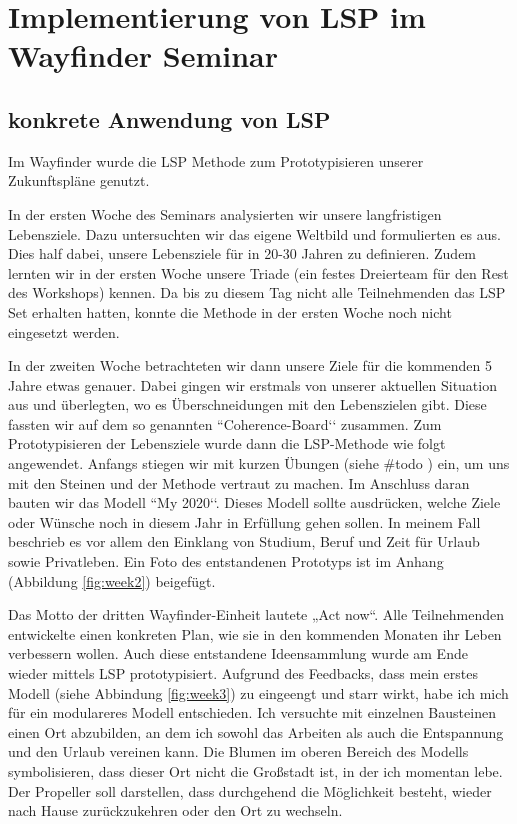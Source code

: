 \section{Implementierung von LSP im Wayfinder Seminar}

\subsection{konkrete Anwendung von LSP}

Im Wayfinder wurde die LSP Methode zum Prototypisieren unserer Zukunftspläne genutzt. 

In der ersten Woche des Seminars analysierten wir unsere langfristigen Lebensziele. Dazu untersuchten wir das eigene Weltbild und formulierten es aus. Dies half dabei, unsere Lebensziele für in 20-30 Jahren zu definieren. Zudem lernten wir in der ersten Woche unsere Triade (ein festes Dreierteam für den Rest des Workshops) kennen. Da bis zu diesem Tag nicht alle Teilnehmenden das LSP Set erhalten hatten, konnte die Methode in der ersten Woche noch nicht eingesetzt werden. 

In der zweiten Woche betrachteten wir dann unsere Ziele für die kommenden 5 Jahre etwas genauer. Dabei gingen wir erstmals von unserer aktuellen Situation aus und überlegten, wo es Überschneidungen mit den Lebenszielen gibt. Diese fassten wir auf dem so genannten ``Coherence-Board‘‘ zusammen. Zum Prototypisieren der Lebensziele wurde dann die LSP-Methode wie folgt angewendet. Anfangs stiegen wir mit kurzen Übungen (siehe \#todo ) ein, um uns mit den Steinen und der Methode vertraut zu machen. Im Anschluss daran bauten wir das Modell ``My 2020‘‘. Dieses Modell sollte ausdrücken, welche Ziele oder Wünsche noch in diesem Jahr in Erfüllung gehen sollen. In meinem Fall beschrieb es vor allem den Einklang von Studium, Beruf und Zeit für Urlaub sowie Privatleben. Ein Foto des entstandenen Prototyps ist im Anhang (Abbildung \ref{fig:week2}) beigefügt.

Das Motto der dritten Wayfinder-Einheit lautete „Act now“. Alle Teilnehmenden entwickelte einen konkreten Plan, wie sie in den kommenden Monaten ihr Leben verbessern wollen. Auch diese entstandene Ideensammlung wurde am Ende wieder mittels LSP prototypisiert. Aufgrund des Feedbacks, dass mein erstes Modell (siehe Abbindung \ref{fig:week3}) zu eingeengt und starr wirkt, habe ich mich für ein modulareres Modell entschieden. Ich versuchte mit einzelnen Bausteinen einen Ort abzubilden, an dem ich sowohl das Arbeiten als auch die Entspannung und den Urlaub vereinen kann. Die Blumen im oberen Bereich des Modells symbolisieren, dass dieser Ort nicht die Großstadt ist, in der ich momentan lebe. Der Propeller soll darstellen, dass durchgehend die Möglichkeit besteht, wieder nach Hause zurückzukehren oder den Ort zu wechseln.


